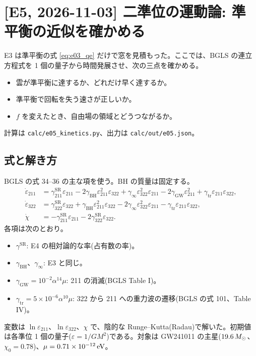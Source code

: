 \section{[E5, 2026-11-03] 二準位の運動論: 準平衡の近似を確かめる}\label{sec:e05}

E3 は準平衡の式 \eqref{eq:e03_qe} だけで窓を見積もった。ここでは、BGLS の連立方程式を 1 個の量子から時間発展させ、次の三点を確かめる。
\begin{itemize}
\item 雲が準平衡に達するか、どれだけ早く達するか。
\item 準平衡で回転を失う速さが正しいか。
\item $f$ を変えたとき、自由場の領域とどうつながるか。
\end{itemize}
計算は \texttt{calc/e05\_kinetics.py}、出力は \texttt{calc/out/e05.json}。

\subsection{式と解き方}

BGLS の式 34--36 の主な項を使う。BH の質量は固定する。
\begin{align}
\dot\varepsilon_{211}&=\gamma^\mathrm{SR}_{211}\varepsilon_{211}-2\gamma_\mathrm{BH}\varepsilon_{211}^2\varepsilon_{322}+\gamma_\infty\varepsilon_{322}^2\varepsilon_{211}-2\gamma_\mathrm{GW}\varepsilon_{211}^2+\gamma_\mathrm{tr}\varepsilon_{211}\varepsilon_{322},\\
\dot\varepsilon_{322}&=\gamma^\mathrm{SR}_{322}\varepsilon_{322}+\gamma_\mathrm{BH}\varepsilon_{211}^2\varepsilon_{322}-2\gamma_\infty\varepsilon_{322}^2\varepsilon_{211}-\gamma_\mathrm{tr}\varepsilon_{211}\varepsilon_{322},\\
\dot\chi&=-\gamma^\mathrm{SR}_{211}\varepsilon_{211}-2\gamma^\mathrm{SR}_{322}\varepsilon_{322}.
\end{align}
各項は次のとおり。
\begin{itemize}
\item $\gamma^\mathrm{SR}$: E4 の相対論的な率(占有数の率)。
\item $\gamma_\mathrm{BH}$、$\gamma_\infty$: E3 と同じ。
\item $\gamma_\mathrm{GW}=10^{-2}\alpha^{14}\mu$: 211 の消滅(BGLS Table I)。
\item $\gamma_\mathrm{tr}=5\times10^{-6}\alpha^{10}\mu$: 322 から 211 への重力波の遷移(BGLS の式 101、Table IV)。
\end{itemize}
変数は $\ln\varepsilon_{211}$、$\ln\varepsilon_{322}$、$\chi$ で、陰的な Runge--Kutta(Radau)で解いた。初期値は各準位 1 個の量子($\varepsilon=1/GM^2$)である。対象は GW241011 の主星($19.6\,M_\odot$、$\chi_0=0.78$)、$\mu=0.71\times10^{-12}\,\mathrm{eV}$。

